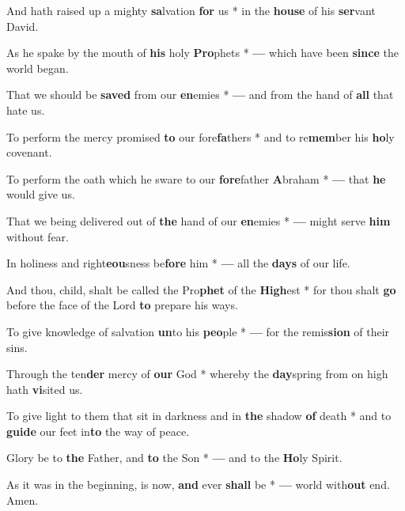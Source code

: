 \begin{multicols}{2}
	And hath raised up a mighty \textbf{sa}lvation \textbf{for} us * in the \textbf{house} of his \textbf{ser}vant David.
	
	As he spake by the mouth of \textbf{his} holy \textbf{Pro}phets * \textbf{---} which have been \textbf{since} the world began.
	
	That we should be \textbf{saved} from our \textbf{en}emies * \textbf{---} and from the hand of \textbf{all} that hate us.
	
	To perform the mercy promised \textbf{to} our fore\textbf{fa}thers * and to re\textbf{mem}ber his \textbf{ho}ly covenant.
	
	To perform the oath which he sware to our \textbf{fore}father \textbf{A}braham * \textbf{---} that \textbf{he} would give us.
	
	That we being delivered out of \textbf{the} hand of our \textbf{en}emies * \textbf{---} might serve \textbf{him} without fear.
	
	In holiness and right\textbf{eou}sness be\textbf{fore} him * \textbf{---} all the \textbf{days} of our life.
	
	And thou, child, shalt be called the Pro\textbf{phet} of the \textbf{High}est * for thou shalt \textbf{go} before the face of the Lord \textbf{to} prepare his ways.
	
	To give knowledge of salvation \textbf{un}to his \textbf{peo}ple * \textbf{---} for the remis\textbf{sion} of their sins.
	
	Through the ten\textbf{der} mercy of \textbf{our} God * whereby the \textbf{day}spring from on high hath \textbf{vi}sited us.
	
	To give light to them that sit in darkness and in \textbf{the} shadow \textbf{of} death * and to \textbf{guide} our feet in\textbf{to} the way of peace.
	
	Glory be to \textbf{the} Father, and \textbf{to} the Son * \textbf{---} and to the \textbf{Ho}ly Spirit.
	
	As it was in the beginning, is now, \textbf{and} ever \textbf{shall} be * \textbf{---} world with\textbf{out} end. Amen.
\end{multicols}